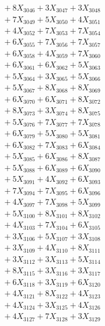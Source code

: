 \documentclass[a4paper,10pt]{article}
\begin{document}
{\begin{align}
&\;  + 8 X_{3046} + 3 X_{3047} + 3 X_{3048} \\[0.3ex]
&\;  + 7 X_{3049} + 5 X_{3050} + 4 X_{3051} \\[0.3ex]
&\;  + 4 X_{3052} + 7 X_{3053} + 7 X_{3054} \\[0.3ex]
&\;  + 6 X_{3055} + 7 X_{3056} + 7 X_{3057} \\[0.3ex]
&\;  + 6 X_{3058} + 4 X_{3059} + 7 X_{3060} \\[0.3ex]
&\;  + 6 X_{3061} + 6 X_{3062} + 5 X_{3063} \\[0.3ex]
&\;  + 5 X_{3064} + 3 X_{3065} + 5 X_{3066} \\[0.3ex]
&\;  + 5 X_{3067} + 8 X_{3068} + 8 X_{3069} \\[0.5ex]\allowbreak
&\;  + 6 X_{3070} + 6 X_{3071} + 8 X_{3072} \\[0.3ex]
&\;  + 8 X_{3073} + 3 X_{3074} + 8 X_{3075} \\[0.3ex]
&\;  + 5 X_{3076} + 7 X_{3077} + 7 X_{3078} \\[0.3ex]
&\;  + 6 X_{3079} + 5 X_{3080} + 5 X_{3081} \\[0.3ex]
&\;  + 6 X_{3082} + 7 X_{3083} + 6 X_{3084} \\[0.3ex]
&\;  + 5 X_{3085} + 6 X_{3086} + 8 X_{3087} \\[0.3ex]
&\;  + 5 X_{3088} + 6 X_{3089} + 6 X_{3090} \\[0.3ex]
&\;  + 5 X_{3091} + 4 X_{3092} + 6 X_{3093} \\[0.3ex]
&\;  + 7 X_{3094} + 7 X_{3095} + 6 X_{3096} \\[0.3ex]
&\;  + 4 X_{3097} + 7 X_{3098} + 5 X_{3099} \\[0.5ex]\allowbreak
&\;  + 5 X_{3100} + 8 X_{3101} + 8 X_{3102} \\[0.3ex]
&\;  + 4 X_{3103} + 7 X_{3104} + 6 X_{3105} \\[0.3ex]
&\;  + 3 X_{3106} + 5 X_{3107} + 3 X_{3108} \\[0.3ex]
&\;  + 3 X_{3109} + 4 X_{3110} + 8 X_{3111} \\[0.3ex]
&\;  + 3 X_{3112} + 3 X_{3113} + 5 X_{3114} \\[0.3ex]
&\;  + 8 X_{3115} + 3 X_{3116} + 3 X_{3117} \\[0.3ex]
&\;  + 6 X_{3118} + 3 X_{3119} + 6 X_{3120} \\[0.3ex]
&\;  + 4 X_{3121} + 8 X_{3122} + 4 X_{3123} \\[0.3ex]
&\;  + 4 X_{3124} + 3 X_{3125} + 4 X_{3126} \\[0.3ex]
&\;  + 4 X_{3127} + 7 X_{3128} + 3 X_{3129} \\[0.5ex]\allowbreak

\end{align}}
\end{document}
